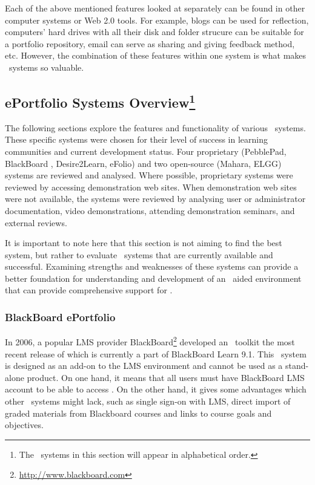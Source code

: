 Each of the above mentioned features looked at separately can be found in other
computer systems or Web 2.0 tools. For example, blogs can be used for
reflection, computers' hard drives with all their disk and folder strucure can
be suitable for a portfolio repository, email can serve as sharing and giving
feedback method, etc. However, the combination of these features within one
system is what makes \ep~systems so valuable.

\subsection[ePortfolio Systems Overview]{ePortfolio Systems
Overview\footnote{The \ep~systems in this section will appear in alphabetical
order.}} 
The following sections explore the features and functionality of various
\ep~systems. These specific systems were chosen for their level of success in
learning communities and current development status. Four proprietary
(PebblePad, BlackBoard \ep, Desire2Learn, eFolio) and two open-source (Mahara,
ELGG) systems are reviewed and analysed. Where possible, proprietary systems
were reviewed by accessing demonstration web sites. When demonstration web
sites were not available, the systems were reviewed by analysing user or
administrator documentation, video demonstrations, attending demonstration
seminars, and external reviews. %

It is important to note here that this section is not aiming to find the best
system, but rather to evaluate \ep~systems that are currently available and
successful. Examining strengths and weaknesses of these systems can provide a
better foundation for understanding and development of an \ep~aided environment
that can provide comprehensive support for \LLLsn.

\subsubsection{BlackBoard ePortfolio}
In 2006, a popular LMS provider
BlackBoard\footnote{\url{http://www.blackboard.com}} developed an \ep~toolkit
the most recent release of which is currently a part of BlackBoard Learn 9.1.
This \ep~system is designed as an add-on to the LMS environment and cannot be
used as a stand-alone product. On one hand, it means that all users must have
BlackBoard LMS account to be able to access \ep. On the other hand, it gives
some advantages which other \ep~systems might lack, such as single sign-on with
LMS, direct import of graded materials from Blackboard courses and links to
course goals and objectives.

